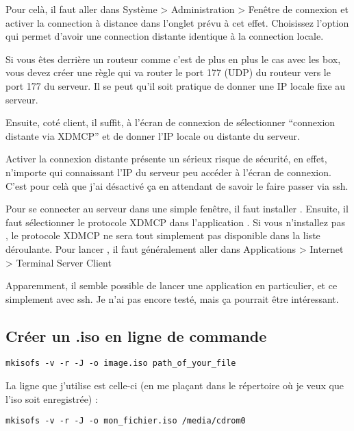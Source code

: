 \documentclass[a4paper,twoside]{article}
\begin{document}
Pour celà, il faut aller dans Système > Administration > Fenêtre de connexion et activer la connection à distance dans l'onglet prévu à cet effet. Choisissez l'option qui permet d'avoir une connection distante identique à la connection locale.

Si vous êtes derrière un routeur comme c'est de plus en plus le cas avec les box, vous devez créer une règle qui va router le port 177 (UDP) du routeur vers le port 177 du serveur. Il se peut qu'il soit pratique de donner une IP locale fixe au serveur.

\bigskip

Ensuite, coté client, il suffit, à l'écran de connexion de sélectionner ``connexion distante via XDMCP'' et de donner l'IP locale ou distante du serveur.

\begin{attention}
Activer la connexion distante présente un sérieux risque de sécurité, en effet, n'importe qui connaissant l'IP du serveur peu accéder à l'écran de connexion. C'est pour celà que j'ai désactivé ça en attendant de savoir le faire passer via ssh.
\end{attention}

Pour se connecter au serveur dans une simple fenêtre, il faut installer . Ensuite, il faut sélectionner le protocole XDMCP dans l'application . Si vous n'installez pas , le protocole XDMCP ne sera tout simplement pas disponible dans la liste déroulante. Pour lancer , il faut généralement aller dans Applications > Internet > Terminal Server Client

\bigskip

Apparemment, il semble possible de lancer une application en particulier, et ce simplement avec ssh. Je n'ai pas encore testé, mais ça pourrait être intéressant.

\subsection{Créer un .iso en ligne de commande}
\begin{verbatim}
mkisofs -v -r -J -o image.iso path_of_your_file
\end{verbatim}

\begin{remarque}
La ligne que j'utilise est celle-ci (en me plaçant dans le répertoire où je veux que l'iso soit enregistrée) :
\begin{verbatim}
mkisofs -v -r -J -o mon_fichier.iso /media/cdrom0
\end{verbatim}
\end{remarque}
\end{document}
